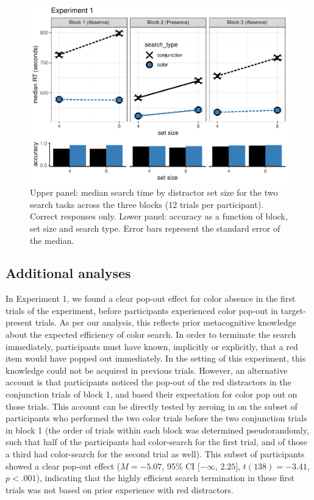 \documentclass[
  english,
  man]{apa6}
\begin{document}
\begin{figure}[H]
\includegraphics[width=\textwidth]{termination_files/figure-latex/exp1Plot-1} \caption{Upper panel: median search time by distractor set size for the two search tasks across the three blocks (12 trials per participant). Correct responses only. Lower panel: accuracy as a function of block, set size and search type. Error bars represent the standard error of the median.}\label{fig:exp1Plot}
\end{figure}

\hypertarget{additional-analyses}{%
\subsection{Additional analyses}\label{additional-analyses}}

In Experiment 1, we found a clear pop-out effect for color absence in the first trials of the experiment, before participants experienced color pop-out in target-present trials. As per our analysis, this reflects prior metacognitive knowledge about the expected efficiency of color search. In order to terminate the search immediately, participants must have known, implicitly or explicitly, that a red item would have popped out immediately. In the setting of this experiment, this knowledge could not be acquired in previous trials. However, an alternative account is that participants noticed the pop-out of the red distractors in the conjunction trials of block 1, and based their expectation for color pop out on those trials. This account can be directly tested by zeroing in on the subset of participants who performed the two color trials before the two conjunction trials in block 1 (the order of trials within each block was determined pseudorandomly, such that half of the participants had color-search for the first trial, and of those a third had color-search for the second trial as well). This subset of participants showed a clear pop-out effect (\(M = -5.07\), 95\% CI \([-\infty\), \(2.25]\), \(t(138) = -3.41\), \(p < .001\)), indicating that the highly efficient search termination in these first trials was not based on prior experience with red distractors.
\end{document}
